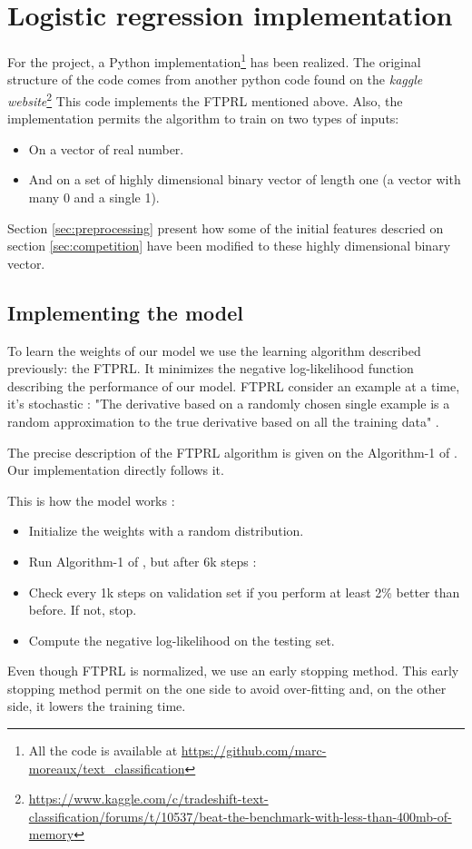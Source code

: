 

\section{Logistic regression implementation}
\label{logistic_regression_implementation}


	For the project, a Python implementation\footnote{All the code is available at \url{https://github.com/marc-moreaux/text_classification}} has been realized. The original structure of the code comes from another python code found on the \textit{kaggle website}\footnote{\url{https://www.kaggle.com/c/tradeshift-text-classification/forums/t/10537/beat-the-benchmark-with-less-than-400mb-of-memory}} This code implements the FTPRL mentioned above. Also, the implementation permits the algorithm to train on two types of inputs: 
	\begin{itemize}
		\item On a vector of real number.
		\item And on a set of highly dimensional binary vector of length one (a vector with many 0 and a single 1).
	\end{itemize}

	Section \ref{sec:preprocessing} present how some of the initial features descried on section \ref{sec:competition} have been modified to these highly dimensional binary vector.




	\subsection{Implementing the model}
		To learn the weights of our model we use the learning algorithm described previously: the FTPRL. It minimizes the negative log-likelihood function describing the performance of our model. FTPRL consider an example at a time, it's stochastic : "The derivative based on a randomly chosen single example is a random approximation to the true derivative based on all the training data" \cite{elkan2013maximum}.
		
		The precise description of the FTPRL algorithm is given on the Algorithm-1 of \cite{mcmahan2013ad}. Our implementation directly follows it.
		
		\vspace{\baselineskip}
		This is how the model works : 
		\begin{itemize}
			\item Initialize the weights with a random distribution.
			\item Run Algorithm-1 of \cite{mcmahan2013ad}, but after 6k steps :
			\item Check every 1k steps on validation set if you perform at least 2\% better than before. If not, stop.
			\item Compute the negative log-likelihood on the testing set.
		\end{itemize}
		Even though FTPRL is normalized, we use an early stopping method. This early stopping method permit on the one side to avoid over-fitting and, on the other side, it lowers the training time.
		
